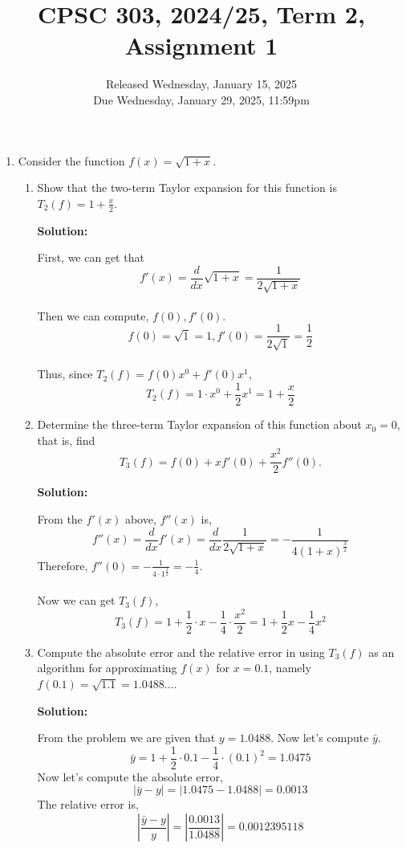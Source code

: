 \documentclass[11pt]{article}
\title{CPSC 303, 2024/25, Term 2, Assignment 1}
\author{Released Wednesday, January 15, 2025 \\
Due Wednesday, January  29, 2025, 11:59pm}
\date{}
\newenvironment{solution}
  {\par\noindent\textbf{Solution:}\par}
  {\par}
\begin{document}
\maketitle 
\thispagestyle{empty}

\begin{enumerate}

  \item Consider the function $f(x)=\sqrt{1+x}$. 
\begin{enumerate}

\item Show that the two-term Taylor expansion for this function is $ T_2(f) = 1+\frac{x}{2}.$ \\ 
  \begin{solution}
    First, we can get that\\ $$f'(x) = \frac{d}{dx}\sqrt{1+x} = \frac{1}{2\sqrt{1+x}}$$ \\ 
    Then we can compute, $f(0),f'(0)$.  \\ $$f(0) = \sqrt{1}= 1,f'(0)=\frac{1}{2\sqrt{1}}=\frac{1}{2}$$ \\ 

    Thus, since $T_2(f) = f(0)x^0 + f'(0)x^1$,
    $$T_2(f) = 1\cdot x^0 + \frac{1}{2}  x^1 = 1+\frac{x}{2}$$
  \end{solution}

\item Determine the three-term Taylor expansion of this function about $x_0=0$, that is, find
$$T_3(f)=f(0)+x f'(0)+\frac{x^2}{2} f''(0).$$

\begin{solution}
  From the $f'(x)$ above, $f''(x)$ is,
  $$f''(x) = \frac{d}{dx}f'(x) = \frac{d}{dx}\frac{1}{2\sqrt{1+x}} = -\frac{1}{4(1+x)^{\frac{3}{2}}}$$ 
  Therefore, $f''(0) = -\frac{1}{4\cdot 1^{\frac{3}{2}}}= -\frac{1}{4}$. \\ \\
  Now we can get $T_3(f)$, \\ $$T_3(f) = 1 + \frac{1}{2} \cdot x - \frac{1}{4} \cdot \frac{x^2}{2} = 1+ \frac{1}{2}x -\frac{1}{4}x^2$$ 
\end{solution} 
\item Compute the absolute error and the relative error in using $T_3(f)$ as an algorithm for approximating $f(x)$ for $x=0.1$, namely $f(0.1)=\sqrt{1.1}=1.0488...$. 

  \begin{solution}
    From the problem we are given that $y = 1.0488$. Now let's compute $\bar{y}$. 
    $$\bar{y} = 1 + \frac{1}{2} \cdot 0.1 - \frac{1}{4} \cdot (0.1)^2 = 1.0475$$
    Now let's compute the absolute error,
    $$\vert \bar{y} -y \vert = \vert 1.0475 - 1.0488 \vert = 0.0013$$
    The relative error is, 
    $$\left| \frac{\bar{y} - y}{y} \right| = \left| \frac{0.0013}{1.0488} \right| = 0.0012395118$$    
  \end{solution}
  

\end{enumerate}
\end{enumerate}
\end{document}

